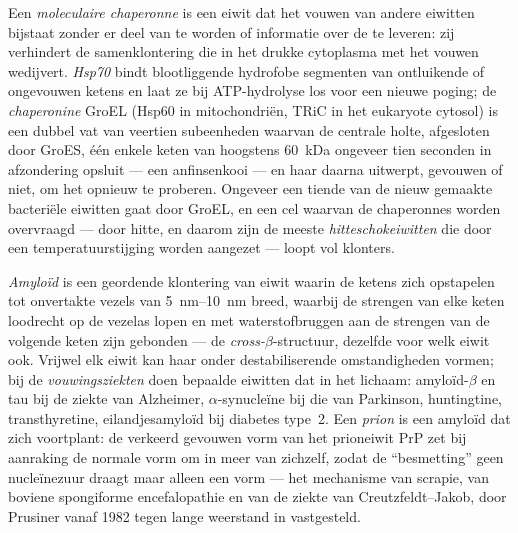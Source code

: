 \begin{definition}[Chaperonnes]\label{def:b3:structural-biology:chaperones}
Een \emph{moleculaire chaperonne} is een eiwit dat het vouwen van
andere eiwitten bijstaat zonder er deel van te worden of informatie
over de  te leveren: zij verhindert de samenklontering die in
het drukke cytoplasma met het vouwen wedijvert. \emph{Hsp70} bindt
blootliggende hydrofobe segmenten van ontluikende of ongevouwen ketens
en laat ze bij ATP-hydrolyse los voor een nieuwe poging; de
\emph{chaperonine} GroEL (Hsp60 in mitochondriën, TRiC in het
eukaryote cytosol) is een dubbel vat van veertien subeenheden waarvan
de centrale holte, afgesloten door GroES, één enkele keten van
hoogstens \qty{60}{kDa} ongeveer tien seconden in afzondering opsluit
--- een anfinsenkooi --- en haar daarna uitwerpt, gevouwen of niet, om
het opnieuw te proberen. Ongeveer een tiende van de nieuw gemaakte
bacteriële eiwitten gaat door GroEL, en een cel waarvan de chaperonnes
worden overvraagd --- door hitte, en daarom zijn de meeste
\emph{hitteschokeiwitten} die door een temperatuurstijging worden
aangezet --- loopt vol klonters.
\end{definition}

\begin{definition}[Amyloïd]\label{def:b3:structural-biology:amyloid}
\emph{Amyloïd} is een geordende klontering van eiwit waarin de ketens
zich opstapelen tot onvertakte vezels van \qtyrange{5}{10}{nm} breed,
waarbij de strengen van elke keten loodrecht op de vezelas lopen en met
waterstofbruggen aan de strengen van de volgende keten zijn gebonden
--- de \emph{cross-$\beta$}-structuur, dezelfde voor welk eiwit ook.
Vrijwel elk eiwit kan haar onder destabiliserende omstandigheden
vormen; bij de \emph{vouwingsziekten} doen bepaalde eiwitten dat in
het lichaam: amyloïd-$\beta$ en tau bij de ziekte van Alzheimer,
$\alpha$-synucleïne bij die van Parkinson, huntingtine, transthyretine,
eilandjesamyloïd bij diabetes type~2. Een \emph{prion} is een amyloïd
dat zich voortplant: de verkeerd gevouwen vorm van het prioneiwit PrP
zet bij aanraking de normale vorm om in meer van zichzelf, zodat de
``besmetting'' geen nucleïnezuur draagt maar alleen een vorm --- het
mechanisme van scrapie, van boviene spongiforme encefalopathie en van
de ziekte van Creutzfeldt--Jakob, door Prusiner vanaf 1982 tegen lange
weerstand in vastgesteld.
\end{definition}

